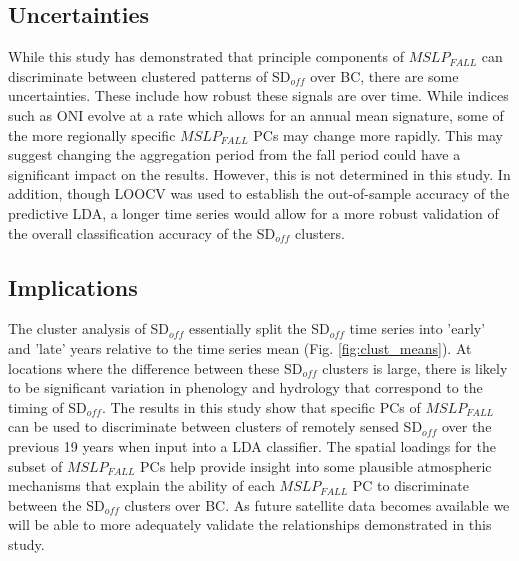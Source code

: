 \documentclass{tATO2e}
\newcommand{\sdoff}{SD$_{off}$}
\begin{document}
\subsection{Uncertainties}
While this study has demonstrated that principle components of $MSLP_{FALL}$ can discriminate between clustered patterns of \sdoff{} over BC, there are some uncertainties. These include how robust these signals are over time. While indices such as ONI evolve at a rate which allows for an annual mean signature, some of the more regionally specific $MSLP_{FALL}$ PCs may change more rapidly. This may suggest changing the aggregation period from the fall period could have a significant impact on the results. However, this is not determined in this study. In addition, though LOOCV was used to establish the out-of-sample accuracy of the predictive LDA, a longer time series would allow for a more robust validation of the overall classification accuracy of the \sdoff{} clusters. 

\subsection{Implications}
The cluster analysis of \sdoff{} essentially split the \sdoff{} time series into 'early' and 'late' years relative to the time series mean (Fig. \ref{fig:clust_means}). At locations where the difference between these \sdoff{} clusters is large, there is likely to be significant variation in phenology and hydrology that correspond to the timing of \sdoff{}. The results in this study show that specific PCs of $MSLP_{FALL}$ can be used to discriminate between clusters of remotely sensed \sdoff{} over the previous 19 years when input into a LDA classifier. The spatial loadings for the subset of $MSLP_{FALL}$ PCs help provide insight into some plausible atmospheric mechanisms that explain the ability of each $MSLP_{FALL}$ PC to discriminate between the \sdoff{} clusters over BC. As future satellite data becomes available we will be able to more adequately validate the relationships demonstrated in this study. 
\end{document}
